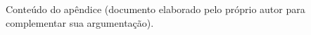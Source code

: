 \label{ape:a}

Conte\'udo do ap\^endice (documento elaborado pelo pr\'oprio autor para
complementar sua argumenta\c{c}\~ao).
